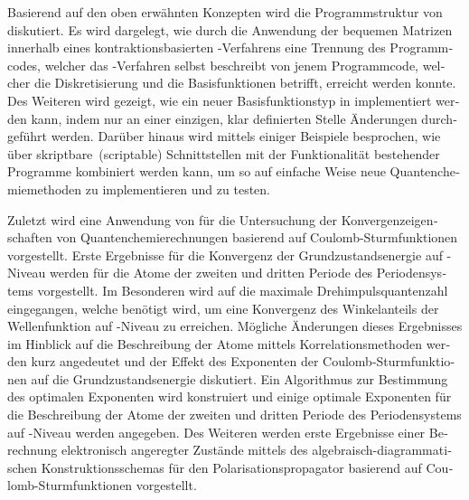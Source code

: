 \begin{otherlanguage}{ngerman}
Basierend auf den oben erwähnten Konzepten wird die Programmstruktur
von \molsturm diskutiert.
Es wird dargelegt, wie durch die Anwendung der bequemen Matrizen
innerhalb eines kontraktionsbasierten \SCF-Verfahrens
eine Trennung des Programmcodes,
welcher das \SCF-Verfahren selbst beschreibt
von jenem Programmcode, welcher die Diskretisierung und die Basisfunktionen betrifft,
erreicht werden konnte.
Des Weiteren wird gezeigt,
wie ein neuer Basisfunktionstyp in \molsturm implementiert werden kann,
indem nur an einer einzigen, klar definierten Stelle Änderungen durchgeführt werden.
Darüber hinaus wird mittels einiger Beispiele besprochen,
wie \molsturm über skriptbare~(scriptable) Schnittstellen
mit der Funktionalität bestehender Programme kombiniert werden kann,
um so auf einfache Weise neue Quantenchemiemethoden zu implementieren und zu testen.

Zuletzt wird eine Anwendung von \molsturm für
die Untersuchung der Konvergenzeigenschaften
von Quantenchemierechnungen basierend auf Coulomb-Sturmfunktionen vorgestellt.
Erste Ergebnisse für die Konvergenz der Grundzustandsenergie auf \HF-Niveau
werden für die Atome der zweiten und dritten Periode des Periodensystems vorgestellt.
Im Besonderen wird auf die maximale Drehimpulsquantenzahl eingegangen,
welche benötigt wird,
um eine Konvergenz des Winkelanteils der Wellenfunktion
auf \HF-Niveau zu erreichen.
Mögliche Änderungen dieses Ergebnisses im Hinblick auf die Beschreibung
der Atome mittels Korrelationsmethoden werden kurz angedeutet
und der Effekt des Exponenten der Coulomb-Sturmfunktionen
auf die Grundzustandsenergie diskutiert.
Ein Algorithmus zur Bestimmung des optimalen Exponenten wird konstruiert
und einige optimale Exponenten für die Beschreibung der Atome
der zweiten und dritten Periode des Periodensystems
auf \HF-Niveau werden angegeben.
Des Weiteren werden erste Ergebnisse einer Berechnung elektronisch
angeregter Zustände
mittels des algebraisch-diagrammatischen Konstruktionsschemas
für den Polarisationspropagator basierend auf Coulomb-Sturmfunktionen vorgestellt.
\end{otherlanguage}
